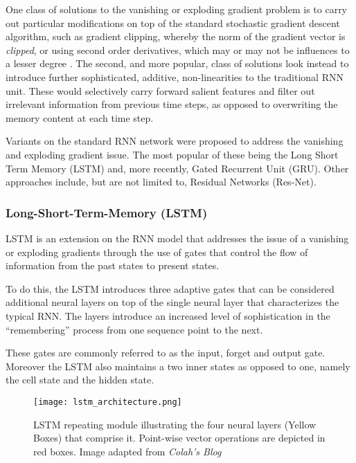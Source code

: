 \documentclass[../../fyp.tex]{subfiles}
\begin{document}
One class of solutions to the vanishing or exploding gradient problem is to carry out particular modifications on top of the standard stochastic gradient descent algorithm, such as gradient clipping, whereby the norm of the gradient vector is \textit{clipped}, or using second order derivatives, which may or may not be influences to a lesser degree \cite{chung2014}.
The second, and more popular, class of solutions look instead to introduce further sophisticated, additive, non-linearities to the traditional RNN unit. These would selectively carry forward salient features and filter out irrelevant information from previous time steps, as opposed to overwriting the memory content at each time step.

Variants on the standard RNN network were proposed to address the vanishing and exploding gradient issue. The most popular of these being the Long Short Term Memory (LSTM) and, more recently, Gated Recurrent Unit (GRU). Other approaches include, but are not limited to, Residual Networks (Res-Net).

\subsubsection{Long-Short-Term-Memory (LSTM)}
LSTM \cite{hochreiter1997} is an extension on the RNN model that addresses the issue of a vanishing or exploding gradients through the use of gates that control the flow of information from the past states to present states.

To do this, the LSTM introduces three adaptive gates that can be considered additional neural layers on top of the single neural layer that characterizes the typical RNN. The layers introduce an increased level of sophistication in the \enquote{remembering} process from one sequence point to the next.

These gates are commonly referred to as the input, forget and output gate. Moreover the LSTM also maintains a two inner states as opposed to one, namely the cell state and the hidden state.

\begin{figure}[!ht]
	\centering
	\texttt{[image: lstm\_architecture.png]}
	\caption{LSTM repeating module illustrating the four neural layers (Yellow Boxes) that comprise it. Point-wise vector operations are depicted in red boxes. Image adapted from \textit{Colah's Blog}\cite{colah-understanding-lstm}}
	\label{fig:lstm_architecture}
\end{figure}
\end{document}
